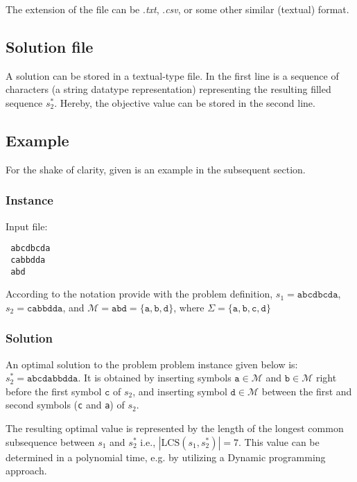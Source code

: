 \documentclass[]{article}
\begin{document}
The extension of the file can be .\textit{txt}, .\textit{csv}, or some other similar (textual) format.

\subsection{Solution file}

A solution can be stored in a textual-type file.  In the first line is a sequence of characters (a string datatype representation) representing the resulting filled sequence $s_2^*$. Hereby, the objective value can be stored in the second line.

\subsection{Example}
For the shake of clarity, given is an example in the subsequent section. 

\subsubsection{Instance}

Input file: 
\begin{verbatim}
 abcdbcda
 cabbdda
 abd
\end{verbatim}

According to the notation provide with the problem definition, $s_1=\texttt{abcdbcda}$, $s_2=\texttt{cabbdda}$, and $\mathcal{M}=\texttt{abd}=\{\texttt{a}, \texttt{b}, \texttt{d}\}$, where $\Sigma=\{\texttt{a}, \texttt{b}, \texttt{c}, \texttt{d} \}$ \\

\subsubsection{Solution}

An optimal solution to the problem problem instance given below is: $s_2^*=\texttt{abcdabbdda}$. It is obtained by inserting symbols $\texttt{a}\in \mathcal{M}$ and $\texttt{b}\in \mathcal{M}$ right before the first symbol $\texttt{c}$ of $s_2$, and inserting  symbol $\texttt{d} \in \mathcal{M}$ between the first and second symbols (\texttt{c} and \texttt{a}) of $s_2$.
 
The resulting optimal value is represented by the length of the longest common subsequence between $s_1$
 and $s_2^*$  i.e., $|\textrm{LCS}(s_1, s_2^*)|=7$. This value can be determined in a polynomial time, e.g. by utilizing  a Dynamic programming approach. 
\end{document}
